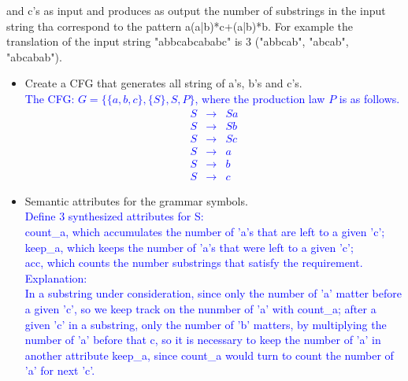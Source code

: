 \documentclass[10pt]{article}
\begin{document}
\begin{enumerate}
          and c's as input and produces as output the number of substrings in the input string tha correspond to the pattern
          a(a|b)*c+(a|b)*b. For example the translation of the input string "abbcabcababc" is 3 ("abbcab", "abcab",
          "abcabab").\\
          \begin{itemize}
              \item Create a CFG that generates all string of a's, b's and c's.\\
                    \textcolor{blue}{
                        The CFG: $G=\{\{a,b,c\},\{S\},S,P\}$, where the production law $P$ is as follows.
                        \[\begin{array}{cll}
                                S & \rightarrow & Sa \\
                                S & \rightarrow & Sb \\
                                S & \rightarrow & Sc \\
                                S & \rightarrow & a  \\
                                S & \rightarrow & b  \\
                                S & \rightarrow & c
                            \end{array}\]
                    }
              \item Semantic attributes for the grammar symbols.\\
                    \textcolor{blue}{
                        Define 3 synthesized attributes for S:\\
                        count\_a, which accumulates the number of 'a's that are left to a given 'c';\\
                        keep\_a, which keeps the number of 'a's that were left to a given 'c';\\
                        acc, which counts the number substrings that satisfy the requirement.\\
                        Explanation:\\
                        In a substring under consideration, since only the number of 'a' matter before a given 'c', so we keep track on the nunmber of 'a' with count\_a; after a given 'c' in a substring, only the number of 'b' matters, by multiplying the number of 'a' before that c, so it is necessary to keep the number of 'a' in another attribute keep\_a, since count\_a would turn to count the number of 'a' for next 'c'.
}
\end{itemize}
\end{enumerate}
\end{document}
